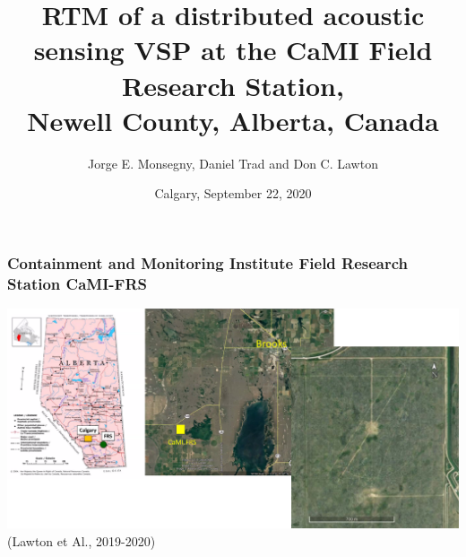 \documentclass[aspectratio=169]{beamer}
\title{RTM of a distributed acoustic sensing VSP at the CaMI Field Research Station, \\​Newell County, Alberta, Canada​​}
\date[Geoconvention 2020]{Calgary, September 22, 2020}
\author[Monsegny Trad Lawton]{Jorge E. Monsegny, Daniel Trad and Don C. Lawton}
\begin{document}
\begin{frame}
 \titlepage 
\end{frame}

\begin{frame}
 \frametitle{Containment and Monitoring Institute Field Research Station CaMI-FRS}
 \includegraphics[scale=0.25]{images/map4.png}
 (Lawton et Al., 2019-2020)
\end{frame}
\end{document}
